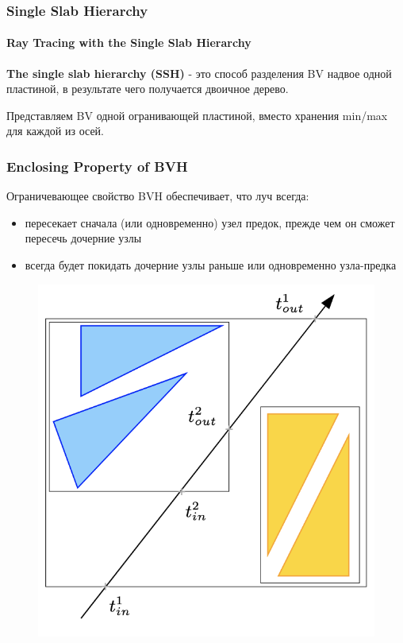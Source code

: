 \documentclass{beamer}
\begin{document}
\begin{frame}
    \frametitle{Single Slab Hierarchy}
    \framesubtitle{Ray Tracing with the Single Slab Hierarchy}
    \textbf{The single slab hierarchy (SSH)} - это способ разделения BV надвое одной пластиной,
    в результате чего получается двоичное дерево.

    Представляем BV одной огранивающей пластиной, вместо хранения min/max для каждой из осей.

\end{frame}

\begin{frame}
    \frametitle{Enclosing Property of BVH}
    \begin{block}{}
        Ограничевающее свойство BVH обеспечивает,
        что луч всегда:
        \begin{itemize}
            \item 
                пересекает сначала (или одновременно) узел предок, прежде чем он
                сможет пересечь дочерние узлы
            \item 
                всегда будет покидать дочерние узлы
                раньше или одновременно узла-предка
        \end{itemize}
    \end{block}

    \begin{figure}
        \includegraphics[keepaspectratio, height=0.5\textheight]{res/enclosing.png}
    \end{figure}

\end{frame}
\end{document}
